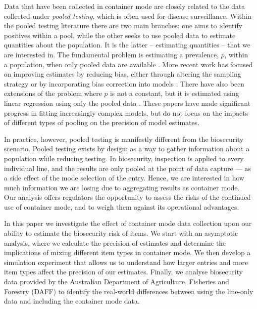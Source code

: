 \documentclass[aoas]{imsart}
\begin{document}
 Data that have been collected in container mode are closely related to the data collected under \emph{pooled testing}, which is often used for disease surveillance. Within the pooled testing literature there are two main branches: one aims to identify positives within a pool, while the other seeks to use pooled data to estimate quantities about the population. It is the latter -- estimating quantities -- that we are interested in. The fundamental problem is estimating a prevalence, \(p\), within a population, when only pooled data are available \cite{thompson_estimation_1962}. More recent work has focused on improving estimates by reducing bias, either through altering the sampling strategy \cite{schaarschmidt_experimental_2007,hepworth_debiased_2009} or by incorporating bias correction into models  \cite{hepworth_bias_2017,hepworth_bias_2021}. There have also been extensions of the problem where \(p\) is not a constant, but it is estimated using linear regression using only the pooled data \cite{delaigle_nonparametric_2015, chatterjee_regression_2020, mcmahan_bayesian_2017, liu_generalized_2020}. These papers have made significant progress in fitting increasingly complex models, but do not focus on the impacts of different types of pooling on the precision of model estimates.

In practice, however, pooled testing is manifestly different from the biosecurity scenario. Pooled testing exists by design: as a way to gather information about a population while reducing testing. In biosecurity, inspection is applied to every individual line, and the results are only pooled at the point of data capture ---  {as a side effect of the mode selection of the entry}. Hence, we are interested in how much information we are losing due to aggregating results as container mode.  {Our analysis offers regulators the opportunity to assess the risks of the continued use of container mode, and to weigh them against its operational advantages.}

In this paper we investigate the effect of container mode data collection upon our ability to estimate the biosecurity risk of items. We start with an asymptotic analysis, where we calculate the precision of estimates and determine the implications of mixing different item types in container mode. We then develop a simulation experiment that allows us to understand how larger entries and more item types affect the precision of our estimates. Finally, we analyse biosecurity data provided by the Australian Department of Agriculture, Fisheries and Forestry (DAFF) to identify the real-world differences between using the line-only data and including the container mode data.
\end{document}
